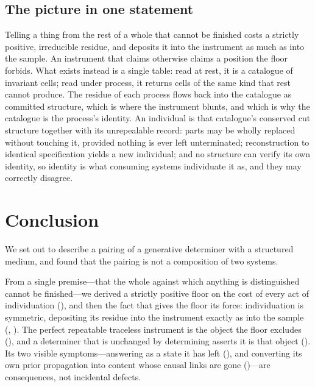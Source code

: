 \documentclass[11pt,twocolumn,a4paper]{article}
\theoremstyle{dirthm}
\theoremstyle{definition}
\theoremstyle{remark}
\begin{document}
\subsection{The picture in one statement}

Telling a thing from the rest of a whole that cannot be finished costs a
strictly positive, irreducible residue, and deposits it into the instrument as
much as into the sample. An instrument that claims otherwise claims a position
the floor forbids. What exists instead is a single table: read at rest, it is a
catalogue of invariant cells; read under process, it returns cells of the same
kind that rest cannot produce. The residue of each process flows back into the
catalogue as committed structure, which is where the instrument blunts, and
which is why the catalogue is the process's identity. An individual is that
catalogue's conserved cut structure together with its unrepealable record:
parts may be wholly replaced without touching it, provided nothing is ever left
unterminated; reconstruction to identical specification yields a new
individual; and no structure can verify its own identity, so identity is what
consuming systems individuate it as, and they may correctly disagree.

\section{Conclusion}
\label{sec:conclusion}

We set out to describe a pairing of a generative determiner with a structured
medium, and found that the pairing is not a composition of two systems.

From a single premise---that the whole against which anything is distinguished
cannot be finished---we derived a strictly positive floor on the cost of every
act of individuation (), and then the fact that gives the floor
its force: individuation is symmetric, depositing its residue into the
instrument exactly as into the sample (,
). The perfect repeatable traceless instrument is the object
the floor excludes (), and a determiner that is unchanged
by determining asserts it is that object
(). Its two visible symptoms---answering as a
state it has left (), and converting its own prior
propagation into content whose causal links are gone
()---are consequences, not incidental defects.
\end{document}
